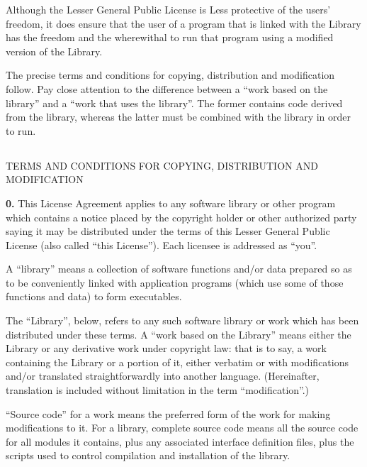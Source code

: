{{{Although the Lesser General Public License is Less protective of the users'
freedom, it does ensure that the user of a program that is linked with the
Library has the freedom and the wherewithal to run that program using a
modified version of the Library. 

The precise terms and conditions for copying, distribution and modification
follow. Pay close attention to the difference between a ``work based on the
library'' and a ``work that uses the library''. The former contains code
derived from the library, whereas the latter must be combined with the library
in order to run. 

\subsection*{
}
\label{SEC34}

TERMS AND CONDITIONS FOR COPYING, DISTRIBUTION AND MODIFICATION 

{\bf 0.} This License Agreement applies to any software library or other
program which contains a notice placed by the copyright holder or other
authorized party saying it may be distributed under the terms of this Lesser
General Public License (also called ``this License''). Each licensee is
addressed as ``you''. 

A ``library'' means a collection of software functions and/or data prepared so
as to be conveniently linked with application programs (which use some of
those functions and data) to form executables. 

The ``Library'', below, refers to any such software library or work which has
been distributed under these terms. A ``work based on the Library'' means
either the Library or any derivative work under copyright law: that is to say,
a work containing the Library or a portion of it, either verbatim or with
modifications and/or translated straightforwardly into another language.
(Hereinafter, translation is included without limitation in the term
``modification''.) 

``Source code'' for a work means the preferred form of the work for making
modifications to it. For a library, complete source code means all the source
code for all modules it contains, plus any associated interface definition
files, plus the scripts used to control compilation and installation of the
library. 

}}}

